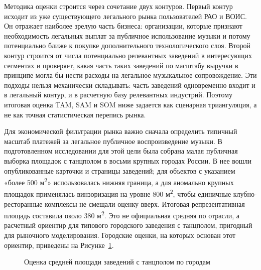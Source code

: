 Методика оценки строится через сочетание двух контуров. Первый контур исходит из уже существующего легального рынка пользователей РАО и ВОИС. Он отражает наиболее зрелую часть бизнеса: организации, которые признают необходимость легальных выплат за публичное использование музыки и потому потенциально ближе к покупке дополнительного технологического слоя. Второй контур строится от числа потенциально релевантных заведений в интересующих сегментах и проверяет, какая часть таких заведений по масштабу выручки в принципе могла бы нести расходы на легальное музыкальное сопровождение. Эти подходы нельзя механически складывать: часть заведений одновременно входит и в легальный контур, и в расчетную базу релевантных индустрий. Поэтому итоговая оценка TAM, SAM и SOM ниже задается как сценарная триангуляция, а не как точная статистическая перепись рынка.

Для экономической фильтрации рынка важно сначала определить типичный масштаб платежей за легальное публичное воспроизведение музыки. В подготовленном исследовании для этой цели была собрана малая публичная выборка площадок с танцполом в восьми крупных городах России. В нее вошли опубликованные карточки и страницы заведений; для объектов с указанием «более 500 м\textsuperscript{2}» использовалась нижняя граница, а для аномально крупных площадок применялась винзоризация на уровне 800 м\textsuperscript{2}, чтобы единичные клубно-ресторанные комплексы не смещали оценку вверх. Итоговая репрезентативная площадь составила около 380 м\textsuperscript{2}. Это не официальная средняя по отрасли, а расчетный ориентир для типового городского заведения с танцполом, пригодный для рыночного моделирования. Городские оценки, на которых основан этот ориентир, приведены на Рисунке~\ref{fig:market:venue-area}.

\begin{figure}[htbp]
\centering
{}
\caption{Оценка средней площади заведений с танцполом по городам}
\label{fig:market:venue-area}
\end{figure}

